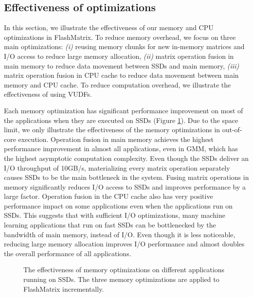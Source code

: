 \subsection{Effectiveness of optimizations}

In this section, we illustrate the effectiveness of our memory and CPU
optimizations in FlashMatrix. To reduce memory overhead, we focus on three
main optimizations: \textit{(i)} reusing memory chunks for new in-memory
matrices and I/O access to reduce large
memory allocation, \textit{(ii)} matrix operation fusion in main
memory to reduce data movement between SSDs and main memory, \textit{(iii)}
matrix operation fusion in CPU cache to reduce data movement between main
memory and CPU cache. To reduce computation overhead, we illustrate
the effectiveness of using VUDFs.

Each memory optimization has significant performance improvement on most of
the applications when they are executed on SSDs (Figure \ref{perf:opts}).
Due to the space limit, we only illustrate the effectiveness of the memory
optimizations in out-of-core execution. Operation fusion in main memory achieves
the highest performance improvement in almost all applications, even in GMM,
which has the highest asymptotic computation complexity. Even though the SSDs
deliver an I/O throughput of 10GB/s, materializing every matrix operation
separately causes SSDs to be the main bottleneck in the system.
Fusing matrix operations in memory significantly reduces I/O access to SSDs and
improves performance by a large factor. Operation fusion in the CPU cache also
has very positive performance impact on some applications even when
the applications run on SSDs. This suggests that with sufficient I/O optimizations,
many machine learning applications that run on fast SSDs can be bottlenecked by
the bandwidth of main memory, instead of I/O. Even though it is less noticeable,
reducing large memory allocation improves I/O performance and almost doubles
the overall performance of all applications.

\begin{figure}
	\begin{center}
		\footnotesize
		\vspace{-15pt}
		
		\vspace{-10pt}
		\caption{The effectiveness of memory optimizations on different
			applications running on SSDs. The three memory optimizations are
		applied to FlashMatrix incrementally.}
		\label{perf:opts}
	\end{center}
\end{figure}

